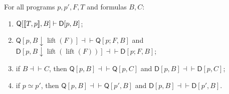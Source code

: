 \begin{lemma}
\label{base:lem:pf-logic}
For all programs $p,p',F,T$ and formulas $B,C$:
\begin{enumerate}[label=\textup{(\roman*)}]
\item $\mathsf Q[[\![ T,p]\!],B]\vdash\mathsf D[p,B]$;
\item $\mathsf Q[p,B{\downarrow}\operatorname{lift}(F)]\dashv\vdash\mathsf Q[p;F,B]$
 and $\mathsf D[p,B{\downarrow}\operatorname{lift}(\operatorname{lift}(F))]
 \dashv\vdash\mathsf D[p;F,B]$;
\item if $B\dashv\vdash C$, then $\mathsf Q[p,B]\dashv\vdash\mathsf Q[p,C]$ and
 $\mathsf D[p,B]\dashv\vdash\mathsf D[p,C]$;
\item if $p\simeq p'$, then $\mathsf Q[p,B]\dashv\vdash\mathsf Q[p',B]$ and
 $\mathsf D[p,B]\dashv\vdash\mathsf D[p',B]$.
\end{enumerate}
\end{lemma}

